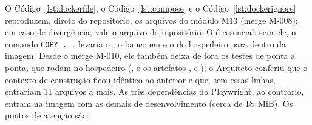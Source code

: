 O Código~\ref{lst:dockerfile}, o Código~\ref{lst:compose} e o Código~\ref{lst:dockerignore} reproduzem, direto do repositório, os arquivos do módulo M13 (merge M-008); em caso de divergência, vale o arquivo do repositório. O  é essencial: sem ele, o comando \texttt{COPY . .} levaria o , o banco em  e o  do hospedeiro para dentro da imagem. Desde o merge M-010, ele também deixa de fora os testes de ponta a ponta, que rodam no hospedeiro (,  e os artefatos ,  e ); o Arquiteto conferiu que o contexto de construção ficou idêntico ao anterior e que, sem essas linhas, entrariam 11 arquivos a mais. As três dependências do Playwright, ao contrário, entram na imagem com as demais de desenvolvimento (cerca de 18~MiB). Os pontos de atenção são:

